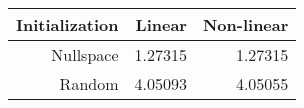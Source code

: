 \begin{tabular}{rrr}
  \hline
  \textbf{Initialization} & \textbf{Linear} & \textbf{Non-linear} \\\hline
  Nullspace & 1.27315 & 1.27315 \\
  Random & 4.05093 & 4.05055 \\\hline
\end{tabular}

